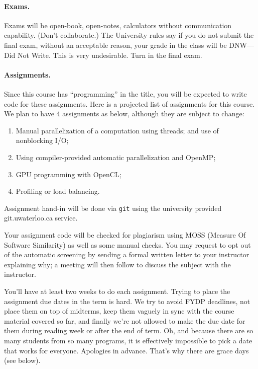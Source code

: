 \documentclass[letterpaper,10pt]{article}
\begin{document}
\paragraph{Exams.} Exams will be open-book, open-notes, calculators without communication capability. (Don't collaborate.) The University rules say if you do not submit the final exam, without an acceptable reason, your grade in the class will be DNW---Did Not Write. This is very undesirable. Turn in the final exam.



\paragraph{Assignments.} Since this course has ``programming'' in the 
title, you will be expected to write code for these assignments.  Here
is a projected list of assignments for this course. We plan to have 4
assignments as below, although they are subject to change:

\begin{enumerate}
\item Manual parallelization of a computation using threads; and use of nonblocking I/O;
\item Using compiler-provided automatic parallelization and OpenMP;
\item GPU programming with OpenCL;
\item Profiling or load balancing.
\end{enumerate}
Assignment hand-in will be done via \texttt{git} using the university provided git.uwaterloo.ca service.

Your assignment code will be checked for plagiarism using MOSS (Measure Of Software Similarity) as well as some manual checks. You may request to opt out of the automatic screening by sending a formal written letter to your instructor explaining why; a meeting will then follow to discuss the subject with the instructor.

You'll have at least two weeks to do each assignment. Trying to place the assignment due dates in the term is hard. We try to avoid FYDP deadlines, not place them on top of midterms, keep them vaguely in sync with the course material covered so far, and finally we're not allowed to make the due date for them during reading week or after the end of term. Oh, and because there are so many students from so many programs, it is effectively impossible to pick a date that works for everyone. Apologies in advance. That's why there are grace days (see below).
\end{document}
